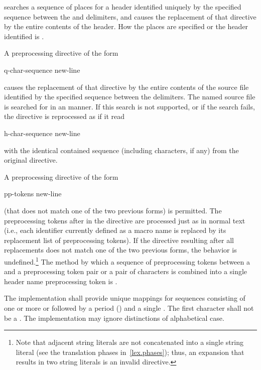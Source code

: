 searches a sequence of
places
for a header identified uniquely by the specified sequence
between the
\tcode{<}
and
\tcode{>}
delimiters,
and causes the replacement of that
directive by the entire contents of the header.
How the places are specified
or the header identified
is .

\pnum
A preprocessing directive of the form
\begin{ncsimplebnf}
 q-char-sequence  new-line
\end{ncsimplebnf}
causes the replacement of that
directive by the entire contents of the
source file identified by the specified sequence between the
delimiters.
The named source file is searched for in an
manner.
If this search is not supported,
or if the search fails,
the directive is reprocessed as if it read
\begin{ncsimplebnf}
 h-char-sequence \terminal{>} new-line
\end{ncsimplebnf}
with the identical contained sequence (including
\tcode{>}
characters, if any) from the original directive.

\pnum
A preprocessing directive of the form

\begin{ncsimplebnf}
 pp-tokens new-line
\end{ncsimplebnf}

(that does not match one of the two previous forms) is permitted.
The preprocessing tokens after
in the directive are processed just as in normal text
(i.e., each identifier currently defined as a macro name is replaced by its
replacement list of preprocessing tokens).
If the directive resulting after all replacements does not match
one of the two previous forms, the behavior is
undefined.\footnote{Note that adjacent string literals are not concatenated into
a single string literal
(see the translation phases in~\ref{lex.phases});
thus, an expansion that results in two string literals is an
invalid directive.}
The method by which a sequence of preprocessing tokens between a
\tcode{<}
and a
\tcode{>}
preprocessing token pair or a pair of
characters is combined into a single header name
preprocessing token is .

\pnum
The implementation shall provide unique mappings for
sequences consisting of one or more
 or 
followed by a period
()
and a single
.
The first character shall not be a .
The implementation may ignore distinctions of alphabetical case.

